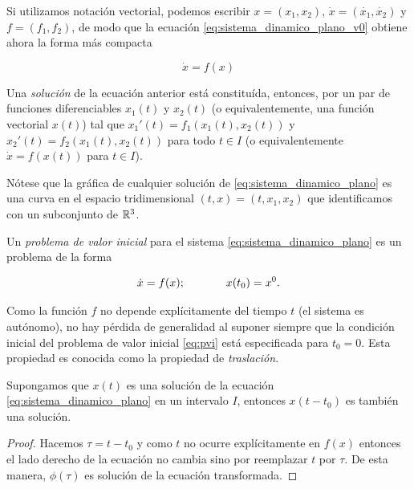 \begin{remark}
Si utilizamos notación vectorial, podemos escribir $x = (x_1, x_2)$, $\dot{x} = (\dot{x_1}, \dot{x_2})$ y $f = (f_1, f_2)$, de modo que la ecuación \ref{eq:sistema_dinamico_plano_v0} obtiene ahora la forma más compacta

\begin{equation} \label{eq:sistema_dinamico_plano}
    \dot{x} = f(x)
\end{equation}
\end{remark}

Una \emph{solución} de la ecuación anterior está constituída, entonces, por un par de funciones diferenciables $x_1(t)$ y $x_2(t)$ (o equivalentemente, una función vectorial $x(t)$) tal que $x_1'(t) = f_1(x_1(t), x_2(t))$ y $x_2'(t) = f_2(x_1(t), x_2(t))$ para todo $t \in I$ (o equivalentemente $\dot{x} = f(x(t))$ para $t \in I$).

Nótese que la gráfica de cualquier solución de \ref{eq:sistema_dinamico_plano} es una curva en el espacio tridimensional $(t,x)=(t,x_1,x_2)$ que identificamos con un subconjunto de ${\mathbb{R}}^3$.

\begin{definition}\label{def:pvi}
Un \emph{problema de valor inicial} para el sistema \ref{eq:sistema_dinamico_plano} es un problema de la forma

\begin{equation} \label{eq:pvi}
 \dot{x} = f(x); \hspace{0.5in} x(t_0) = x^0.
\end{equation}

\end{definition}

Como la función $f$ no depende explícitamente del tiempo $t$ (el sistema es autónomo), no hay pérdida de generalidad al suponer siempre que la condición inicial del problema de valor inicial \ref{eq:pvi} está especificada para $t_0 = 0$. Esta propiedad es conocida como la propiedad de \emph{traslación}.

\begin{lemma} Supongamos que $x(t)$ es una solución de la ecuación \ref{eq:sistema_dinamico_plano} en un intervalo $I$, entonces $x(t-t_0)$ es también una solución.
\begin{proof}Hacemos $\tau = t - t_0$ y como $t$ no ocurre explícitamente en $f(x)$ entonces el lado derecho de la ecuación no cambia sino por reemplazar $t$ por $\tau$. De esta manera, $\phi(\tau)$ es solución de la ecuación transformada.
\end{proof}
\end{lemma}

